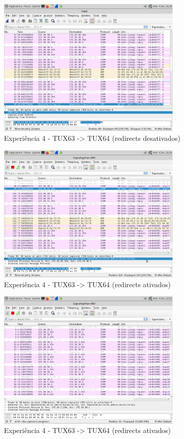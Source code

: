 \documentclass[11pt,a4paper]{article}
\begin{document}
\begin{figure}[H]
    \centering
    \includegraphics[width=0.8\textwidth]{images/experiencia4-ping3-4.png}
    \caption{Experiência 4 - TUX63 -> TUX64 (redirects desativados)}
\end{figure}

\begin{figure}[H]
    \centering
    \includegraphics[width=0.8\textwidth]{images/experiencia4-ping3-Rc.png}
    \caption{Experiência 4 - TUX63 -> TUX64 (redirects ativados)}
\end{figure}

\begin{figure}[H]
    \centering
    \includegraphics[width=0.8\textwidth]{images/experiencia4-ping3-Router.png}
    \caption{Experiência 4 - TUX63 -> TUX64 (redirects ativados)}
\end{figure}
\end{document}

